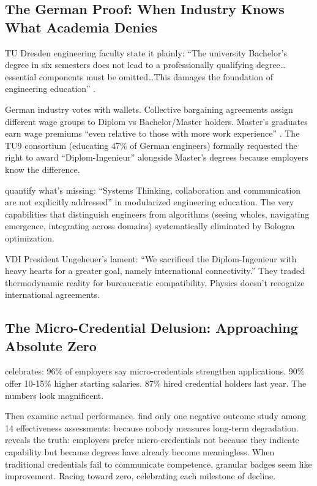 \subsection{The German Proof: When Industry Knows What Academia Denies}

TU Dresden engineering faculty state it plainly: ``The university Bachelor's degree in six semesters does not lead to a professionally qualifying degree\ldots essential components must be omitted\ldots This damages the foundation of engineering education'' \citep{odenbach2015}.

German industry votes with wallets. Collective bargaining agreements assign different wage groups to Diplom vs Bachelor/Master holders. Master's graduates earn wage premiums ``even relative to those with more work experience'' \citep{wieschke2020}. The TU9 consortium (educating 47\% of German engineers) formally requested the right to award ``Diplom-Ingenieur'' alongside Master's degrees because employers know the difference.

\citet{kaiser2022} quantify what's missing: ``Systems Thinking, collaboration and communication are not explicitly addressed'' in modularized engineering education. The very capabilities that distinguish engineers from algorithms (seeing wholes, navigating emergence, integrating across domains) systematically eliminated by Bologna optimization.

VDI President Ungeheuer's lament: ``We sacrificed the Diplom-Ingenieur with heavy hearts for a greater goal, namely international connectivity.'' They traded thermodynamic reality for bureaucratic compatibility. Physics doesn't recognize international agreements.

\subsection{The Micro-Credential Delusion: Approaching Absolute Zero}

\citet{lumina2025} celebrates: 96\% of employers say micro-credentials strengthen applications. 90\% offer 10-15\% higher starting salaries. 87\% hired credential holders last year. The numbers look magnificent.

Then examine actual performance. \citet{ha2022} find only one negative outcome study among 14 effectiveness assessments: because nobody measures long-term degradation. \citet{gauthier2020} reveals the truth: employers prefer micro-credentials not because they indicate capability but because degrees have already become meaningless. When traditional credentials fail to communicate competence, granular badges seem like improvement. Racing toward zero, celebrating each milestone of decline.

